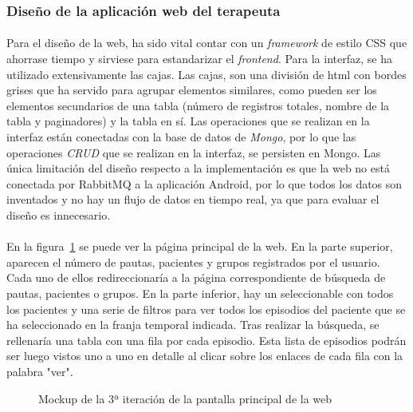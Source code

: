 \subsubsection{Diseño de la aplicación web del terapeuta}
\paragraph{}
Para el diseño de la web, ha sido vital contar con un \textit{framework} de estilo CSS que ahorrase tiempo y sirviese para estandarizar el \textit{frontend}. Para la interfaz, se ha utilizado extensivamente las cajas. Las cajas, son una división de html con bordes grises que ha servido para agrupar elementos similares, como pueden ser los elementos secundarios de una tabla (número de registros totales, nombre de la tabla y paginadores) y la tabla en sí. Las operaciones que se realizan en la interfaz están conectadas con la base de datos de \textit{Mongo}, por lo que las operaciones \textit{CRUD} que se realizan en la interfaz, se persisten en Mongo. Las única limitación del diseño respecto a la implementación es que la web no está conectada por RabbitMQ a la aplicación Android, por lo que todos los datos son inventados y no hay un flujo de datos en tiempo real, ya que para evaluar el diseño es innecesario.

\paragraph{}
En la figura~\ref{c4:fig:v3:web:index} se puede ver la página principal de la web. En la parte superior, aparecen el número de pautas, pacientes y grupos registrados por el usuario. Cada uno de ellos redireccionaría a la página correspondiente de búsqueda de pautas, pacientes o grupos. En la parte inferior, hay un seleccionable con todos los pacientes y una serie de filtros para ver todos los episodios del paciente que se ha seleccionado en la franja temporal indicada. Tras realizar la búsqueda, se rellenaría una tabla con una fila por cada episodio. Esta lista de episodios podrán ser luego vistos uno a uno en detalle al clicar sobre los enlaces de cada fila con la palabra "ver".

\begin{figure}[H]
    \centering
    \caption[Mockup de la 3ª iteración de la pantalla principal de la web]{Mockup de la 3ª iteración de la pantalla principal de la web}
    \label{c4:fig:v3:web:index}
\end{figure}


